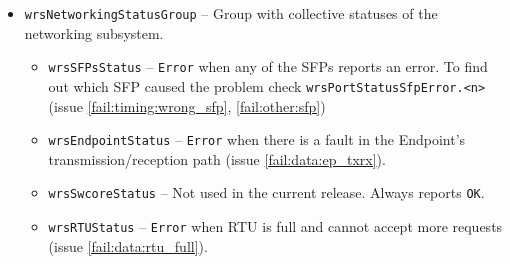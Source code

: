 \begin{itemize}
\begin{itemize}
      \item \texttt{wrsNetworkingStatusGroup} -- Group with collective statuses
        of the networking subsystem.
      \begin{itemize}
        \item \texttt{wrsSFPsStatus} -- \texttt{Error} when any of the SFPs
          reports an error. To find out which SFP caused the problem check
          \texttt{wrsPortStatusSfpError.<n>} (issue \ref{fail:timing:wrong_sfp},
          \ref{fail:other:sfp})
        \item \texttt{wrsEndpointStatus} -- \texttt{Error} when there is a fault
          in the Endpoint's transmission/reception path (issue
          \ref{fail:data:ep_txrx}).
        \item \texttt{wrsSwcoreStatus} -- Not used in the current release.
          Always reports \texttt{OK}.
      \item \texttt{wrsRTUStatus} -- \texttt{Error} when RTU is full and cannot
        accept more requests (issue \ref{fail:data:rtu_full}).
      \end{itemize}
    \end{itemize}


\end{itemize}
